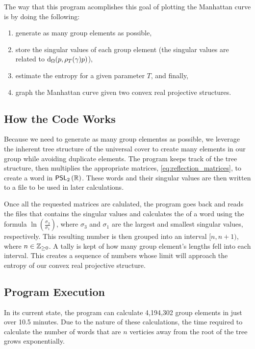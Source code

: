 \documentclass{amsart}
\begin{document}
	The way that this program acomplishes this goal of plotting the Manhattan curve is by doing the following:
	\begin{enumerate}[label=\arabic*.]
		\item generate as many group elements as possible,
		\item store the singular values of each group element (the singular values are related to $\operatorname{d}_\Omega(p,\rho_T(\gamma)p)$),
		\item estimate the entropy for a given parameter $T$, and finally,
		\item graph the Manhattan curve given two convex real projective structures.
	\end{enumerate}
	
	\subsection{How the Code Works}
	
	Because we need to generate as many group elementss as possible, we leverage the inherent tree structure of the universal cover to create many elements in our group while avoiding duplicate elements. The program keeps track of the tree structure, then multiplies the appropriate matrices, \eqref{eq:reflection_matrices}, to create a word in $\mathsf{PSL}_{2}\left(\mathbb{R}\right)$. These words and their singular values are then written to a file to be used in later calculations. 
	
	Once all the requested matrices are calulated, the program goes back and reads the files that contains the singular values and calculates the  of a word using the formula $\ln\left(\frac{\sigma_3}{\sigma_1}\right)$, where $\sigma_3$ and $\sigma_1$ are the largest and smallest singular values, respectively. This resulting number is then grouped into an interval $[n,n+1)$, where $n \in \mathbb{Z}_{\geq 0}$. A tally is kept of how many group element's lengths fell into each interval. This creates a sequence of numbers whose limit will approach the entropy of our convex real projective structure.
	
	\subsection{Program Execution}
	
	In its current state, the program can calculate 4,194,302 group elements in just over 10.5 minutes. Due to the nature of these calculations, the time required to calculate the number of words that are $n$ verticies away from the root of the tree grows exponentially. 
	
\end{document}
